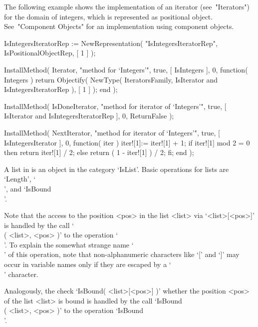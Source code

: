 The following example shows the implementation of an iterator
(see~"Iterators") for the domain of integers,
which is represented as positional object.
See~"Component Objects" for an implementation using component objects.

\begintt
    IsIntegersIteratorRep := NewRepresentation( "IsIntegersIteratorRep",
        IsPositionalObjectRep, [ 1 ] );

    InstallMethod( Iterator,
        "method for `Integers'",
        true,
        [ IsIntegers ], 0,
        function( Integers )
        return Objectify( NewType( IteratorsFamily,
                                       IsIterator
                                   and IsIntegersIteratorRep ),
                          [ 1 ] );
        end );

    InstallMethod( IsDoneIterator,
        "method for iterator of `Integers'",
        true,
        [ IsIterator and IsIntegersIteratorRep ], 0,
        ReturnFalse );

    InstallMethod( NextIterator,
        "method for iterator of `Integers'",
        true,
        [ IsIntegersIterator ], 0,
        function( iter )
        iter![1]:= iter![1] + 1;
        if iter![1] mod 2 = 0 then
          return iter![1] / 2;
        else
          return ( 1 - iter![1] ) / 2;
        fi;
        end );
\endtt


A list in {\GAP} is an object in the category `IsList'.
Basic operations for lists are `Length', `\\[\\]', and `IsBound\\[\\]'.

Note that the access to the position <pos> in the list <list>
via `<list>[<pos>]' is handled by the call `\\[\\]( <list>, <pos> )'
to the operation `\\[\\]'.
To explain the somewhat strange name `\\[\\]' of this operation,
note that non-alphanumeric characters like `[' and `]' may occur in
{\GAP} variable names only if they are escaped by a `\\' character.

Analogously, the check `IsBound( <list>[<pos>] )' whether the position
<pos> of the list <list> is bound is handled by the call
`IsBound\\[\\]( <list>, <pos> )' to the operation
`IsBound\\[\\]'.

